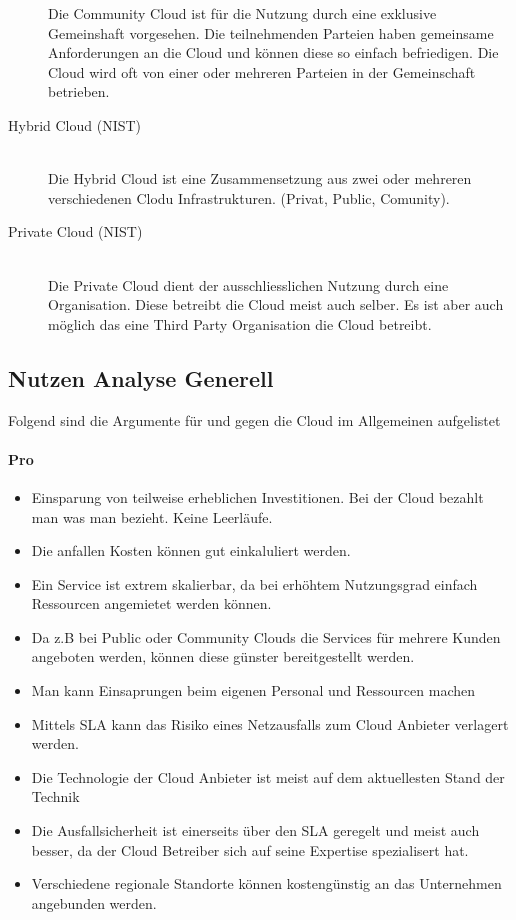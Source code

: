\begin{description}
	Die Community Cloud ist für die Nutzung durch eine exklusive Gemeinshaft vorgesehen. Die teilnehmenden Parteien haben gemeinsame Anforderungen an die Cloud und können diese so einfach befriedigen. Die Cloud wird oft von einer oder mehreren Parteien in der Gemeinschaft betrieben.
	\item[Hybrid Cloud (NIST)]  \hfill \\
	Die Hybrid Cloud ist eine Zusammensetzung aus zwei oder mehreren verschiedenen Clodu Infrastrukturen. (Privat, Public, Comunity). 
	\item[Private Cloud (NIST)]  \hfill \\
	Die Private Cloud dient der ausschliesslichen Nutzung durch eine Organisation. Diese betreibt die Cloud meist auch selber. Es ist aber auch möglich das eine Third Party Organisation die Cloud betreibt.
\end{description}


\subsection{Nutzen Analyse Generell}
Folgend sind die Argumente für und gegen die Cloud im Allgemeinen aufgelistet
\paragraph{Pro}
\begin{itemize}
	\item Einsparung von teilweise erheblichen Investitionen. Bei der Cloud bezahlt man was man bezieht. Keine Leerläufe.
	\item Die anfallen Kosten können gut einkaluliert werden.
	\item Ein Service ist extrem skalierbar, da bei erhöhtem Nutzungsgrad einfach Ressourcen angemietet werden können.
	\item Da z.B bei Public oder Community Clouds die Services für mehrere Kunden angeboten werden, können diese günster bereitgestellt werden. 
	\item Man kann Einsaprungen beim eigenen Personal und Ressourcen machen
	\item Mittels SLA kann das Risiko eines Netzausfalls zum Cloud Anbieter verlagert werden.
	\item Die Technologie der Cloud Anbieter ist meist auf dem aktuellesten Stand der Technik
	\item Die Ausfallsicherheit ist einerseits über den SLA geregelt und meist auch besser, da der Cloud Betreiber sich auf seine Expertise spezialisert hat.
	\item Verschiedene regionale Standorte können kostengünstig an das Unternehmen angebunden werden.
\end{itemize}

